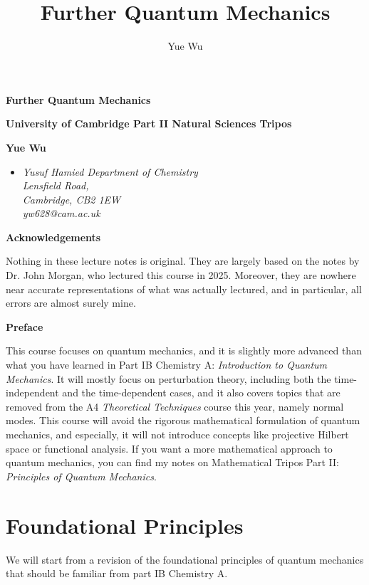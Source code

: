 \documentclass{article}
\title{Further Quantum Mechanics}
\author{Yue Wu}
\theoremstyle{plain}\theoremheaderfont{\normalfont\itshape}\theorembodyfont{\rmfamily}\theoremseparator{.}\newtheorem*{rem}{Remark}\newtheorem*{ex}{Example}\newtheorem*{proof}{Proof}\newtheorem*{altp}{Alternative proof}
\theoremstyle{plain}\theoremheaderfont{\normalfont\bfseries}\theorembodyfont{\rmfamily}\theoremseparator{.}\newtheorem{thm}{Theorem}[section]\newtheorem{lem}[thm]{Lemma}\newtheorem{prop}[thm]{Proposition}\newtheorem*{cor}{Corollary}\newtheorem{defn}[thm]{Definition}\newtheorem{clm}[thm]{Claim}\newtheorem{clminproof}{Claim}
\theoremstyle{break}\theoremheaderfont{\normalfont\itshape}\theorembodyfont{\rmfamily}\theoremseparator{.\medskip}\newtheorem*{proofskip}{Proof}\newtheorem*{exs}{Examples}\newtheorem*{rems}{Remarks}
\theoremstyle{break}\theoremheaderfont{\normalfont\bfseries}\theorembodyfont{\rmfamily}\theoremseparator{.\medskip}\newtheorem{lemskip}[thm]{Lemma}\newtheorem{defnskip}[thm]{Definition}\newtheorem{propskip}[thm]{Proposition}\newtheorem{thmskip}[thm]{Theorem}
\numberwithin{equation}{section}
\begin{document}
    \setlength{\parindent}{0pt}
	\Huge\textsf{\textbf{Further Quantum Mechanics}}
		
	\Large\textsf{\textbf{University of Cambridge Part II Natural Sciences Tripos}}

	\noindent\makebox[\linewidth]{\rule{\textwidth}{2pt}}

	\large\textsf{\textbf{Yue Wu}}
	\begin{itemize}[topsep=0pt,leftmargin=15pt]
		\item[] \textit{Yusuf Hamied Department of Chemistry\\
		Lensfield Road,\\
		Cambridge, CB2 1EW}\\

		\textit{yw628@cam.ac.uk}
	\end{itemize}
    \thispagestyle{empty}
    \setlength{\parindent}{15pt}

    \newpage
    \begin{center}
		\textbf{\Large{Acknowledgements}}
	\end{center}
	\large
	Nothing in these lecture notes is original. They are largely based on the notes by Dr. John Morgan, who lectured this course in 2025. Moreover, they are nowhere near accurate representations of what was actually lectured, and in particular, all errors are almost surely mine.

    \vskip 30pt

    \begin{center}
		\textbf{\Large{Preface}}
	\end{center}
	\large
    This course focuses on quantum mechanics, and it is slightly more advanced than what you have learned in Part IB Chemistry A: \textit{Introduction to Quantum Mechanics}. It will mostly focus on perturbation theory, including both the time-independent and the time-dependent cases, and it also covers topics that are removed from the A4 \textit{Theoretical Techniques} course this year, namely normal modes. This course will avoid the rigorous mathematical formulation of quantum mechanics, and especially, it will not introduce concepts like projective Hilbert space or functional analysis. If you want a more mathematical approach to quantum mechanics, you can find my notes on Mathematical Tripos Part II: \textit{Principles of Quantum Mechanics}.
    
	\normalsize
    \newpage
	\tableofcontents
	\newpage
    
    \section{Foundational Principles}
    We will start from a revision of the foundational principles of quantum mechanics that should be familiar from part IB Chemistry A.
\end{document}
